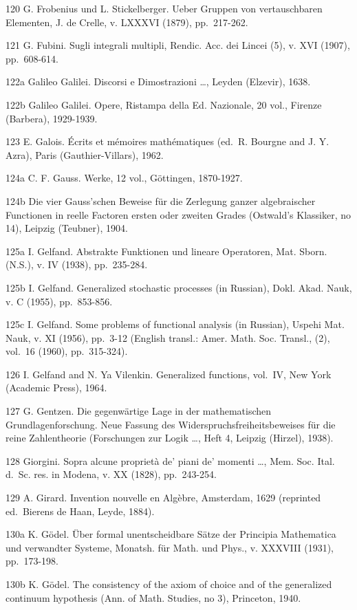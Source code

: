 120 G. Frobenius und L. Stickelberger. Ueber Gruppen von vertauschbaren Elementen, J. de Crelle, v. LXXXVI (1879), pp.~217-262.

121 G. Fubini. Sugli integrali multipli, Rendic. Acc. dei Lincei (5), v. XVI (1907), pp.~608-614.

122a Galileo Galilei. Discorsi e Dimostrazioni \ldots, Leyden (Elzevir), 1638.

122b Galileo Galilei. Opere, Ristampa della Ed. Nazionale, 20 vol., Firenze (Barbera), 1929-1939.

123 E. Galois. Écrits et mémoires mathématiques (ed.~R. Bourgne and J. Y. Azra), Paris (Gauthier-Villars), 1962.

124a C. F. Gauss. Werke, 12 vol., Göttingen, 1870-1927.

124b Die vier Gauss'schen Beweise für die Zerlegung ganzer algebraischer Functionen in reelle Factoren ersten oder zweiten Grades (Ostwald's Klassiker, no 14), Leipzig (Teubner), 1904.

125a I. Gelfand. Abstrakte Funktionen und lineare Operatoren, Mat. Sborn. (N.S.), v. IV (1938), pp.~235-284.

125b I. Gelfand. Generalized stochastic processes (in Russian), Dokl. Akad. Nauk, v. C (1955), pp.~853-856.

125c I. Gelfand. Some problems of functional analysis (in Russian), Uspehi Mat. Nauk, v. XI (1956), pp.~3-12 (English transl.: Amer. Math. Soc. Transl., (2), vol.~16 (1960), pp.~315-324).

126 I. Gelfand and N. Ya Vilenkin. Generalized functions, vol.~IV, New York (Academic Press), 1964.

127 G. Gentzen. Die gegenwärtige Lage in der mathematischen Grundlagenforschung. Neue Fassung des Widerspruchsfreiheitsbeweises für die reine Zahlentheorie (Forschungen zur Logik \ldots, Heft 4, Leipzig (Hirzel), 1938).

128 Giorgini. Sopra alcune proprietà de' piani de' momenti \ldots, Mem. Soc. Ital. d.~Sc. res. in Modena, v. XX (1828), pp.~243-254.

129 A. Girard. Invention nouvelle en Algèbre, Amsterdam, 1629 (reprinted ed.~Bierens de Haan, Leyde, 1884).

130a K. Gödel. Über formal unentscheidbare Sätze der Principia Mathematica und verwandter Systeme, Monatsh. für Math. und Phys., v. XXXVIII (1931), pp.~173-198.

130b K. Gödel. The consistency of the axiom of choice and of the generalized continuum hypothesis (Ann. of Math. Studies, no 3), Princeton, 1940.

